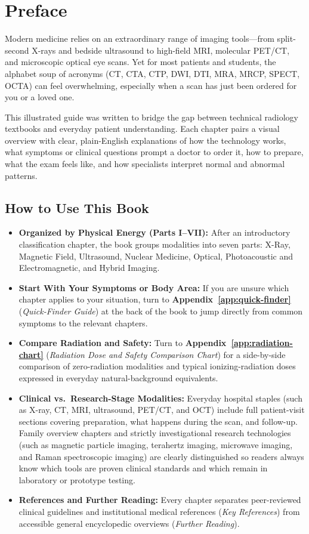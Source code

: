 \chapter*{Preface}

Modern medicine relies on an extraordinary range of imaging tools---from split-second X-rays and bedside ultrasound to high-field MRI, molecular PET/CT, and microscopic optical eye scans. Yet for most patients and students, the alphabet soup of acronyms (CT, CTA, CTP, DWI, DTI, MRA, MRCP, SPECT, OCTA) can feel overwhelming, especially when a scan has just been ordered for you or a loved one.

This illustrated guide was written to bridge the gap between technical radiology textbooks and everyday patient understanding. Each chapter pairs a visual overview with clear, plain-English explanations of how the technology works, what symptoms or clinical questions prompt a doctor to order it, how to prepare, what the exam feels like, and how specialists interpret normal and abnormal patterns.

\section*{How to Use This Book}
\begin{itemize}
  \item \textbf{Organized by Physical Energy (Parts I--VII):} After an introductory classification chapter, the book groups modalities into seven parts: X-Ray, Magnetic Field, Ultrasound, Nuclear Medicine, Optical, Photoacoustic and Electromagnetic, and Hybrid Imaging.
  \item \textbf{Start With Your Symptoms or Body Area:} If you are unsure which chapter applies to your situation, turn to \textbf{Appendix~\ref{app:quick-finder}} (\textit{Quick-Finder Guide}) at the back of the book to jump directly from common symptoms to the relevant chapters.
  \item \textbf{Compare Radiation and Safety:} Turn to \textbf{Appendix~\ref{app:radiation-chart}} (\textit{Radiation Dose and Safety Comparison Chart}) for a side-by-side comparison of zero-radiation modalities and typical ionizing-radiation doses expressed in everyday natural-background equivalents.
  \item \textbf{Clinical vs.\ Research-Stage Modalities:} Everyday hospital staples (such as X-ray, CT, MRI, ultrasound, PET/CT, and OCT) include full patient-visit sections covering preparation, what happens during the scan, and follow-up. Family overview chapters and strictly investigational research technologies (such as magnetic particle imaging, terahertz imaging, microwave imaging, and Raman spectroscopic imaging) are clearly distinguished so readers always know which tools are proven clinical standards and which remain in laboratory or prototype testing.
  \item \textbf{References and Further Reading:} Every chapter separates peer-reviewed clinical guidelines and institutional medical references (\textit{Key References}) from accessible general encyclopedic overviews (\textit{Further Reading}).
\end{itemize}
